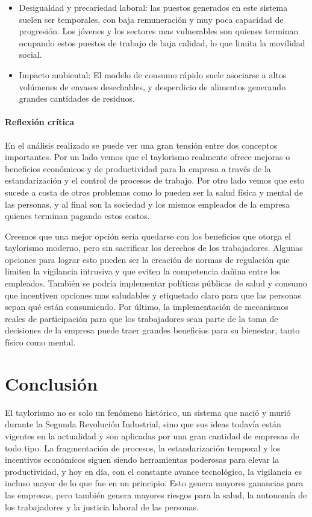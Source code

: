 \documentclass[12pt]{article}
\begin{document}
\begin{itemize}
\begin{itemize}
      \item Desigualdad y precariedad laboral: las puestos generados en este sistema suelen ser temporales, con baja remuneración y muy poca capacidad de progresión. Los jóvenes y los sectores mas vulnerables son quienes terminan ocupando estos puestos de trabajo de baja calidad, lo que limita la movilidad social.

      \item Impacto ambiental: El modelo de consumo rápido suele asociarse a altos volúmenes de envases desechables, y desperdicio de alimentos generando grandes cantidades de residuos.
    \end{itemize}
  \end{itemize}

  \paragraph{Reflexión crítica}\mbox{}

  En el análisis realizado se puede ver una gran tensión entre dos conceptos importantes. Por un lado vemos que el taylorismo realmente ofrece mejoras o beneficios económicos y de productividad para la empresa a través de la estandarización y el control de procesos de trabajo. Por otro lado vemos que esto sucede a costa de otros problemas como lo pueden ser la salud física y mental de las personas, y al final son la sociedad y los mismos empleados de la empresa quienes terminan pagando estos costos.

  Creemos que una mejor opción sería quedarse con los beneficios que otorga el taylorismo moderno, pero sin sacrificar los derechos de los trabajadores. Algunas opciones para lograr esto pueden ser la creación de normas de regulación que limiten la vigilancia intrusiva y que eviten la competencia dañina entre los empleados. También se podría implementar políticas públicas de salud y consumo que incentiven opciones mas saludables y etiquetado claro para que las personas sepan qué están consumiendo. Por último, la implementación de mecanismos reales de participación para que los trabajadores sean parte de la toma de decisiones de la empresa puede traer grandes beneficios para su bienestar, tanto físico como mental.

  \section{Conclusión}
  El taylorismo no es solo un fenómeno histórico, un sistema que nació y murió durante la Segunda Revolución Industrial, sino que sus ideas todavía están vigentes en la actualidad y son aplicadas por una gran cantidad de empresas de todo tipo. La fragmentación de procesos, la estandarización temporal y los incentivos económicos siguen siendo herramientas poderosas para elevar la productividad, y hoy en día, con el constante avance tecnológico, la vigilancia es incluso mayor de lo que fue en un principio. Esto genera mayores ganancias para las empresas, pero también genera mayores riesgos para la salud, la autonomía de los trabajadores y la justicia laboral de las personas.

  \newpage
  \printbibliography
\end{document}
